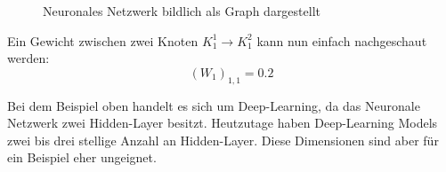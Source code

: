 \documentclass[12pt,letterpaper,ngerman]{article}
\begin{document}
\begin{example}
\begin{figure}[H]
\begin{center}
      \caption{ Neuronales Netzwerk bildlich als Graph dargestellt}
    \end{center}
  \end{figure}
  Ein Gewicht zwischen zwei Knoten $K_1^1 \to K_1^2$ kann nun einfach nachgeschaut werden:
  \[
    (W_1)_{1,1} = 0.2
  \]
\end{example}
Bei dem Beispiel oben handelt es sich um Deep-Learning, da das Neuronale 
Netzwerk zwei Hidden-Layer besitzt. Heutzutage haben Deep-Learning Models
zwei bis drei stellige Anzahl an Hidden-Layer. Diese Dimensionen sind aber
für ein Beispiel eher ungeignet.
\end{document}
